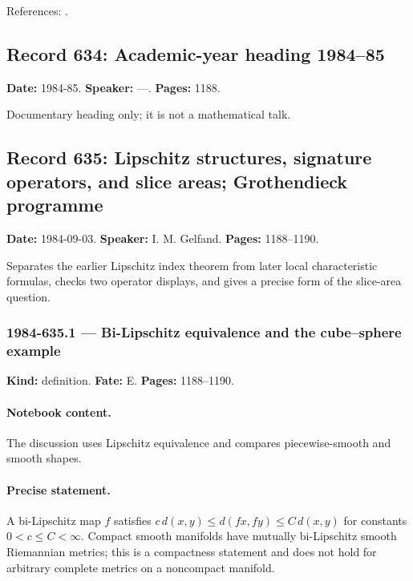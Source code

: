 \noindent References: \citep{margulis1981amalgams,cornulierkar2011fa}.\par

\subsection{Record 634: Academic-year heading 1984--85}

\label{talk:634}

\noindent\textbf{Date:} 1984-85. \textbf{Speaker:} —. \textbf{Pages:} 1188.\par

Documentary heading only; it is not a mathematical talk.

\subsection{Record 635: Lipschitz structures, signature operators, and slice areas; Grothendieck programme}

\label{talk:635}

\noindent\textbf{Date:} 1984-09-03. \textbf{Speaker:} I. M. Gelfand. \textbf{Pages:} 1188--1190.\par

Separates the earlier Lipschitz index theorem from later local characteristic formulas, checks two operator displays, and gives a precise form of the slice-area question.

\subsubsection{1984-635.1 --- Bi-Lipschitz equivalence and the cube--sphere example}

\label{item:1984-635.1}

\noindent\textbf{Kind:} definition. \textbf{Fate:} E. \textbf{Pages:} 1188--1190.\par

\paragraph{Notebook content.} The discussion uses Lipschitz equivalence and compares piecewise-smooth and smooth shapes.

\paragraph{Precise statement.} A bi-Lipschitz map \(f\) satisfies \(c\,d(x,y)\le d(fx,fy)\le C\,d(x,y)\) for constants \(0<c\le C<\infty\). Compact smooth manifolds have mutually bi-Lipschitz smooth Riemannian metrics; this is a compactness statement and does not hold for arbitrary complete metrics on a noncompact manifold.

